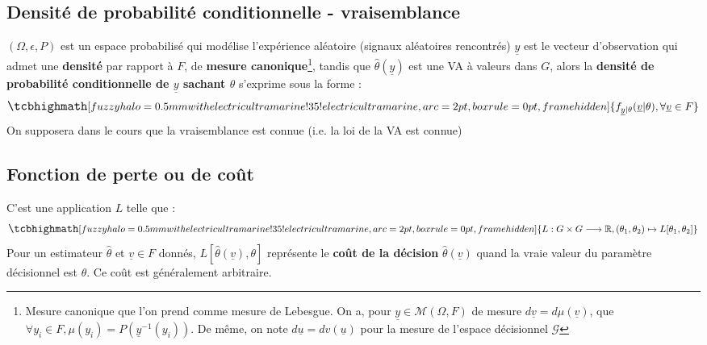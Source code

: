 \subsection{Densité de probabilité conditionnelle - vraisemblance}
\noindent $(\Omega, \epsilon, P)$ est un espace probabilisé qui modélise l'expérience aléatoire (signaux aléatoires rencontrés) \newline
\noindent $\underline{y}$ est le vecteur d'observation qui admet une \textbf{densité} par rapport à $F$, de \textbf{mesure canonique}\footnote{Mesure canonique que l'on prend comme mesure de Lebesgue. \newline On a, pour $\underline{y} \in \mathcal{M}(\Omega, F)$ de mesure $d\underline{v} = d\mu(\underline{v})$, que $\forall y_{i} \in F, \mu(y_{i}) = P(\underline{y}^{-1}(y_{i}))$. De même, on note $d\underline{u} = dv(\underline{u})$ pour la mesure de l'espace décisionnel $\mathcal{G}$}, tandis que $\widehat{\theta}(\underline{y})$ est une VA à valeurs dans $G$, alors la \textbf{densité de probabilité conditionnelle de $\underline{y}$ sachant $\theta$ } s'exprime sous la forme :
\begin{equation}
    \large
    \tcbhighmath[fuzzy halo=0.5mm with electricultramarine!35!electricultramarine,arc=2pt,
    boxrule=0pt,frame hidden]{ 
        f_{\underline{y}|\theta}(\underline{v}|\theta), \forall \underline{v} \in F
     } \nonumber
    \normalsize
\end{equation}
On supposera dans le cours que la vraisemblance est connue (i.e. la loi de la VA est connue)
\subsection{Fonction de perte ou de coût}
C'est une application $L$ telle que :
\begin{equation}
    \large
    \tcbhighmath[fuzzy halo=0.5mm with electricultramarine!35!electricultramarine,arc=2pt,
    boxrule=0pt,frame hidden]{ 
        L : G \times G \longrightarrow \mathbb{R}, (\theta_{1},\theta_{2}) \mapsto L[\theta_{1},\theta_{2}] \nonumber
     } \nonumber
    \normalsize
\end{equation}
Pour un estimateur $\widehat{\theta}$ et $\underline{v} \in F$ donnés, $L[\widehat{\theta}(\underline{v}), \theta]$ représente le \textbf{coût de la décision} $\widehat{\theta}(\underline{v})$ quand la vraie valeur du paramètre décisionnel est $\theta$. Ce coût est généralement arbitraire. \newline
